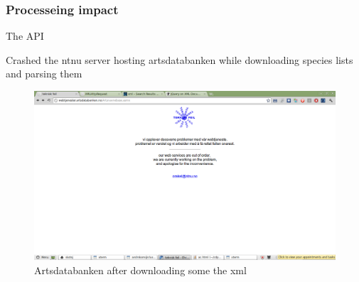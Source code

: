 	\subsubsection{Processeing impact}
	The API 

	Crashed the ntnu server hosting artsdatabanken while downloading species lists and parsing them

\begin{figure}[htb]
	\centering
	\includegraphics[width=1\textwidth]{preperation/ntnu_server_artsdatabanken.png}
	\caption{Artsdatabanken after downloading some the xml}
	\label{fig:latex}
\end{figure}
